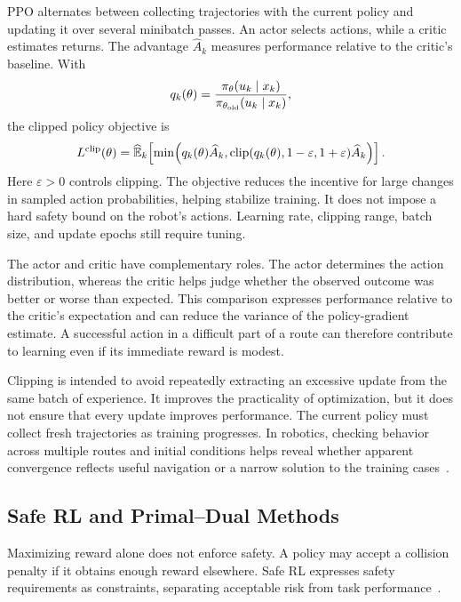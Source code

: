 PPO alternates between collecting trajectories with the current policy and updating it over several minibatch passes. An actor selects actions, while a critic estimates returns. The advantage $\widehat A_k$ measures performance relative to the critic's baseline. With
\begin{equation}
q_k(\theta)=\frac{\pi_\theta(u_k\mid x_k)}{\pi_{\theta_{\rm old}}(u_k\mid x_k)},
\end{equation}
the clipped policy objective is
\begin{equation}
L^{\rm clip}(\theta)=\widehat{\mathbb E}_k\!\left[
\min\!\left(q_k(\theta)\widehat A_k,
\operatorname{clip}(q_k(\theta),1-\varepsilon,1+\varepsilon)\widehat A_k\right)
\right].
\label{lit:ppo}
\end{equation}
Here $\varepsilon>0$ controls clipping. The objective reduces the incentive for large changes in sampled action probabilities, helping stabilize training. It does not impose a hard safety bound on the robot's actions. Learning rate, clipping range, batch size, and update epochs still require tuning.

The actor and critic have complementary roles. The actor determines the action distribution, whereas the critic helps judge whether the observed outcome was better or worse than expected. This comparison expresses performance relative to the critic's expectation and can reduce the variance of the policy-gradient estimate. A successful action in a difficult part of a route can therefore contribute to learning even if its immediate reward is modest.

Clipping is intended to avoid repeatedly extracting an excessive update from the same batch of experience. It improves the practicality of optimization, but it does not ensure that every update improves performance. The current policy must collect fresh trajectories as training progresses. In robotics, checking behavior across multiple routes and initial conditions helps reveal whether apparent convergence reflects useful navigation or a narrow solution to the training cases~\cite{litPPO2017}.

\subsection{Safe RL and Primal--Dual Methods}
\label{lit:constrained}
Maximizing reward alone does not enforce safety. A policy may accept a collision penalty if it obtains enough reward elsewhere. Safe RL expresses safety requirements as constraints, separating acceptable risk from task performance~\cite{litCPO2017}.

